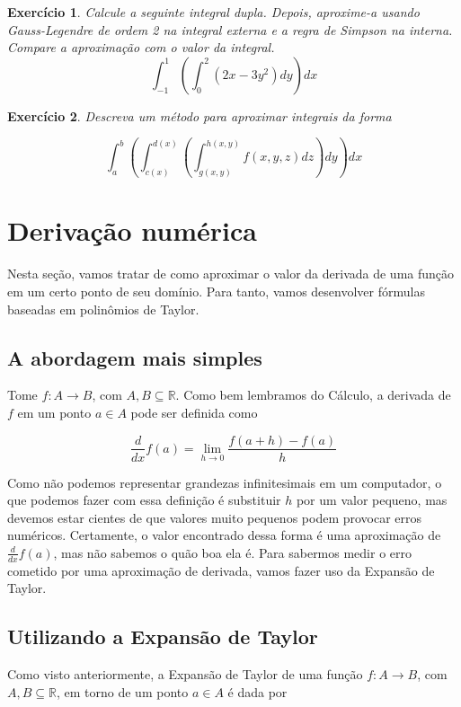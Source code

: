 \documentclass[]{article}
\newtheorem{exercicio}{Exercício}
\numberwithin{equation}{section}
\begin{document}
\begin{exercicio}
	Calcule a seguinte integral dupla. Depois, aproxime-a usando Gauss-Legendre de ordem 2 na integral externa e a regra de Simpson na interna. Compare a aproximação com o valor da integral. $$\int_{-1}^{1} \left(\int_{0}^{2} (2x - 3y^2) dy\right) dx$$
\end{exercicio}

\begin{exercicio}
	Descreva um método para aproximar integrais da forma

	$$
	\int_{a}^{b} \left(\int_{c(x)}^{d(x)} \left(\int_{g(x, y)}^{h(x, y)} f(x, y, z) dz\right) dy\right) dx
	$$
\end{exercicio}

\section{Derivação numérica}

Nesta seção, vamos tratar de como aproximar o valor da derivada de uma função em um certo ponto de seu domínio. Para tanto, vamos desenvolver fórmulas baseadas em polinômios de Taylor.

\subsection{A abordagem mais simples}

Tome $f : A \to B$, com $A, B \subseteq \mathbb{R}$. Como bem lembramos do Cálculo, a derivada de $f$ em um ponto $a \in A$ pode ser definida como

$$
\frac{d}{dx} f(a) = \lim_{h \to 0} \frac{f(a + h) - f(a)}{h}
$$

Como não podemos representar grandezas infinitesimais em um computador, o que podemos fazer com essa definição é substituir $h$ por um valor pequeno, mas devemos estar cientes de que valores muito pequenos podem provocar erros numéricos. Certamente, o valor encontrado dessa forma é uma aproximação de $\frac{d}{dx} f(a)$, mas não sabemos o quão boa ela é. Para sabermos medir o erro cometido por uma aproximação de derivada, vamos fazer uso da Expansão de Taylor.

\subsection{Utilizando a Expansão de Taylor}

Como visto anteriormente, a Expansão de Taylor de uma função $f : A \to B$, com $A, B \subseteq \mathbb{R}$, em torno de um ponto $a \in A$ é dada por
\end{document}
